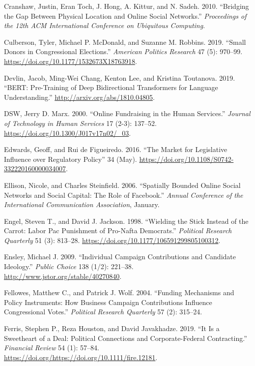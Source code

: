 \documentclass[12pt,]{article}
\begin{document}
\leavevmode\hypertarget{ref-cranshaw2010}{}%
Cranshaw, Justin, Eran Toch, J. Hong, A. Kittur, and N. Sadeh. 2010.
``Bridging the Gap Between Physical Location and Online Social
Networks.'' \emph{Proceedings of the 12th ACM International Conference
on Ubiquitous Computing}.

\leavevmode\hypertarget{ref-culberson2019}{}%
Culberson, Tyler, Michael P. McDonald, and Suzanne M. Robbins. 2019.
``Small Donors in Congressional Elections.'' \emph{American Politics
Research} 47 (5): 970--99.
\url{https://doi.org/10.1177/1532673X18763918}.

\leavevmode\hypertarget{ref-bert}{}%
Devlin, Jacob, Ming-Wei Chang, Kenton Lee, and Kristina Toutanova. 2019.
``BERT: Pre-Training of Deep Bidirectional Transformers for Language
Understanding.'' \url{http://arxiv.org/abs/1810.04805}.

\leavevmode\hypertarget{ref-marx2000}{}%
DSW, Jerry D. Marx. 2000. ``Online Fundraising in the Human Services.''
\emph{Journal of Technology in Human Services} 17 (2-3): 137--52.
\url{https://doi.org/10.1300/J017v17n02/_03}.

\leavevmode\hypertarget{ref-edwards2016}{}%
Edwards, Geoff, and Rui de Figueiredo. 2016. ``The Market for
Legislative Influence over Regulatory Policy'' 34 (May).
\url{https://doi.org/10.1108/S0742-332220160000034007}.

\leavevmode\hypertarget{ref-ellison2006}{}%
Ellison, Nicole, and Charles Steinfield. 2006. ``Spatially Bounded
Online Social Networks and Social Capital: The Role of Facebook.''
\emph{Annual Conference of the International Communication Association},
January.

\leavevmode\hypertarget{ref-engel1998}{}%
Engel, Steven T., and David J. Jackson. 1998. ``Wielding the Stick
Instead of the Carrot: Labor Pac Punishment of Pro-Nafta Democrats.''
\emph{Political Research Quarterly} 51 (3): 813--28.
\url{https://doi.org/10.1177/106591299805100312}.

\leavevmode\hypertarget{ref-ensley2009}{}%
Ensley, Michael J. 2009. ``Individual Campaign Contributions and
Candidate Ideology.'' \emph{Public Choice} 138 (1/2): 221--38.
\url{http://www.jstor.org/stable/40270840}.

\leavevmode\hypertarget{ref-fellowes2004}{}%
Fellowes, Matthew C., and Patrick J. Wolf. 2004. ``Funding Mechanisms
and Policy Instruments: How Business Campaign Contributions Influence
Congressional Votes.'' \emph{Political Research Quarterly} 57 (2):
315--24.

\leavevmode\hypertarget{ref-ferris2019}{}%
Ferris, Stephen P., Reza Houston, and David Javakhadze. 2019. ``It Is a
Sweetheart of a Deal: Political Connections and Corporate-Federal
Contracting.'' \emph{Financial Review} 54 (1): 57--84.
\url{https://doi.org/https://doi.org/10.1111/fire.12181}.
\end{document}
